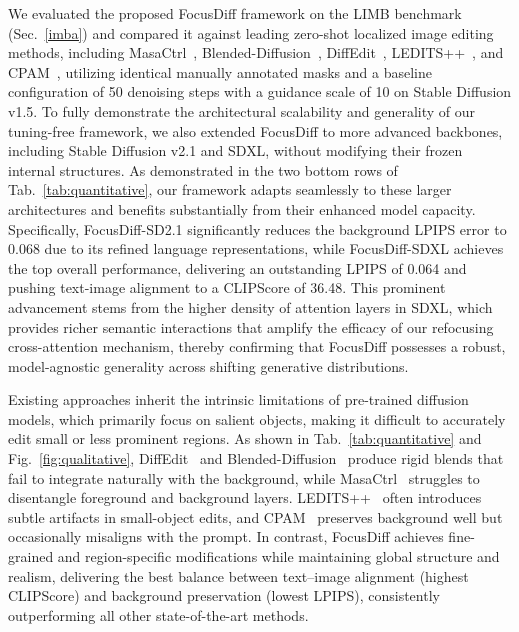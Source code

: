 \documentclass[runningheads]{llncs}
\begin{document}
We evaluated the proposed FocusDiff framework on the LIMB benchmark (Sec.~\ref{imba}) and compared it against leading zero-shot localized image editing methods, including MasaCtrl~\cite{cao_2023_masactrl}, Blended-Diffusion~\cite{avrahami2023blended}, DiffEdit~\cite{couairon2022diffedit}, LEDITS++~\cite{brack2024ledits++}, and CPAM~\cite{vo2025cpam}, utilizing identical manually annotated masks and a baseline configuration of 50 denoising steps with a guidance scale of 10 on Stable Diffusion v1.5. To fully demonstrate the architectural scalability and generality of our tuning-free framework, we also extended FocusDiff to more advanced backbones, including Stable Diffusion v2.1 and SDXL, without modifying their frozen internal structures. As demonstrated in the two bottom rows of Tab.~\ref{tab:quantitative}, our framework adapts seamlessly to these larger architectures and benefits substantially from their enhanced model capacity. Specifically, FocusDiff-SD2.1 significantly reduces the background LPIPS error to 0.068 due to its refined language representations, while FocusDiff-SDXL achieves the top overall performance, delivering an outstanding LPIPS of 0.064 and pushing text-image alignment to a CLIPScore of 36.48. This prominent advancement stems from the higher density of attention layers in SDXL, which provides richer semantic interactions that amplify the efficacy of our refocusing cross-attention mechanism, thereby confirming that FocusDiff possesses a robust, model-agnostic generality across shifting generative distributions.


Existing approaches inherit the intrinsic limitations of pre-trained diffusion models, which primarily focus on salient objects, making it difficult to accurately edit small or less prominent regions. As shown in Tab.~\ref{tab:quantitative} and Fig.~\ref{fig:qualitative}, DiffEdit~\cite{couairon2022diffedit} and Blended-Diffusion~\cite{avrahami2023blended} produce rigid blends that fail to integrate naturally with the background, while MasaCtrl~\cite{cao_2023_masactrl} struggles to disentangle foreground and background layers. LEDITS++~\cite{brack2024ledits++} often introduces subtle artifacts in small-object edits, and CPAM~\cite{vo2025cpam} preserves background well but occasionally misaligns with the prompt. In contrast, FocusDiff achieves fine-grained and region-specific modifications while maintaining global structure and realism, delivering the best balance between text–image alignment (highest CLIPScore) and background preservation (lowest LPIPS), consistently outperforming all other state-of-the-art methods.
\end{document}
